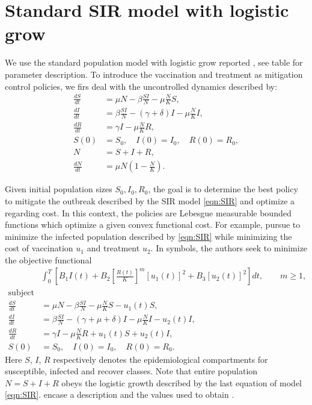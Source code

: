 \section{Standard SIR model with logistic grow}
We use the standard population model with logistic grow reported
\cite{Schaefer2009}, see table for parameter description. To introduce the 
vaccination and treatment as mitigation control policies, we firs deal with the
uncontrolled dynamics described by:
\begin{equation}\label{eqn:SIR}
	\begin{aligned}
		\frac{dS}{dt} &=
			\mu N  
			- \beta \frac{S I}{N} 
			- \mu \frac{N}{K} S ,
		\\
		\frac{dI}{dt} &=
			\beta \frac{S I}{N}
			- (\gamma + \delta) I
			- \mu \frac{N}{K} I,
		\\
		\frac{dR}{dt} &= 
			\gamma I 
			- \mu \frac{N}{K} R ,
		\\
		S(0) &= S_0, \quad
		I(0) = I_0, \quad
		R(0) = R_0,
		\\
		N &= S + I +R,
		\\
		\frac{dN}{dt} &=
			\mu N 
			\left(
				1 - \frac{N}{K}
			\right).
	\end{aligned}
\end{equation}

Given initial population sizes $S_0, I_0, R_0$, the goal is to determine the best policy to
mitigate the outbreak described by the SIR model \eqref{eqn:SIR} and optimize a regarding  cost. In this context, the policies are Lebesgue measurable bounded functions
which optimize a given convex functional cost. For example, \citeauthor{Schaefer2009} pursue to minimize the infected population described by \eqref{eqn:SIR} while minimizing the cost of vaccination $u_1$ and treatment $u_2$. In symbols, the authors seek to minimize the objective functional
\begin{equation}
	\label{eqn:sir_logistic}
  \begin{aligned}
      & \int_{0}^T	
    		\left[
    			B_1 I(t) 
    			+ B_2 \left[\frac{R(t)}{K}\right]^m [u_1(t)]^2 + B_3 [u_2(t)]^2
    		\right] dt,
    		\qquad  m\geq 1,
      \\
    \text{subject to}
  \\
    \frac{dS}{dt} &=
			\mu N  
			- \beta \frac{S I}{N} 
			- \mu \frac{N}{K} S - u_1(t) S,
		\\
		\frac{dI}{dt} &=
			\beta \frac{S I}{N}
			- (\gamma  + \mu + \delta) I 
			- \mu \frac{N}{K} I
			- u_2(t) I,
		\\
		\frac{dR}{dt} &= 
			\gamma I 
			- \mu \frac{N}{K} R 
			+ u_1(t) S 
			+ u_2(t) I,
		\\
		S(0) &= S_0, \quad
		I(0) = I_0, \quad
		R(0) = R_0. \quad
	\end{aligned}
\end{equation}
%
%
Here $S$, $I$, $R$ respectively denotes the epidemiological
compartments for susceptible, infected and recover classes. Note 
that entire population $N=S+I+R$ obeys the logistic growth described by the
last equation of model \eqref{eqn:SIR}.  encase a 
description and the values used to obtain .

